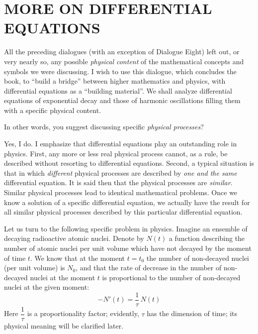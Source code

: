 

\chapter{MORE ON DIFFERENTIAL EQUATIONS}
\label{more-diff-eqns}

\athr All the preceding dialogues (with an exception of Dialogue Eight) left out, or very nearly so, any possible \emph{physical content} of the mathematical concepts and symbols we were discussing. I wish to use this dialogue, which concludes the book, to ``build a bridge'' between higher mathematics and physics, with differential equations as a ``building material''. We shall analyze differential equations of exponential decay and those of harmonic oscillations filling them with a specific physical content.

\rdr In other words, you suggest discussing specific
\emph{physical processes}?

\athr Yes, I do. I emphasize that differential equations play an outstanding role in physics. First, any more or less real physical process cannot, as a rule, be described without resorting to differential equations. Second, a typical situation is that in which \emph{different} physical processes are described by \emph{one and the same} differential equation. It is said then that the physical processes are \emph{similar}. Similar physical processes lead to identical mathematical problems. Once we know a solution of a specific differential equation, we actually have the result for all similar physical processes described by this particular differential equation.

Let us turn to the following specific problem in physics. Imagine an ensemble of decaying radioactive atomic nuclei. Denote by $N (t)$ a function describing the number of atomic nuclei per unit volume which have not decayed by the moment of time $t$. We know that at the moment $t = t_{0}$ the number of non-decayed nuclei (per unit volume) is $N_{0}$, and that the rate of decrease in the number of non-decayed nuclei at the moment $t$ is proportional to the number of non-decayed nuclei at the given moment:
\begin{equation}%
\boxed{
-N' (t) = \dfrac{1}{\tau} \, N(t)}
\label{nuclear-decay}
\end{equation}
Here $\dfrac{1}{\tau}$ is a proportionality factor; evidently, $\tau$ has the
dimension of time; its physical meaning will be clarified later.

